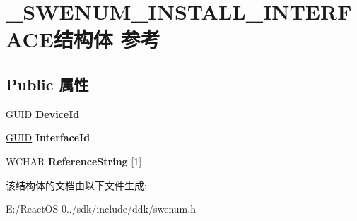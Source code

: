 \hypertarget{struct___s_w_e_n_u_m___i_n_s_t_a_l_l___i_n_t_e_r_f_a_c_e}{}\section{\+\_\+\+S\+W\+E\+N\+U\+M\+\_\+\+I\+N\+S\+T\+A\+L\+L\+\_\+\+I\+N\+T\+E\+R\+F\+A\+C\+E结构体 参考}
\label{struct___s_w_e_n_u_m___i_n_s_t_a_l_l___i_n_t_e_r_f_a_c_e}
\subsection*{Public 属性}
\begin{DoxyCompactItemize}
\item 
\mbox{\label{struct___s_w_e_n_u_m___i_n_s_t_a_l_l___i_n_t_e_r_f_a_c_e_af4cd6357b46129f77a8c8bd18ed1926d}} 
\hyperlink{interface_g_u_i_d}{G\+U\+ID} {\bfseries Device\+Id}
\item 
\mbox{\label{struct___s_w_e_n_u_m___i_n_s_t_a_l_l___i_n_t_e_r_f_a_c_e_a49b3e677d7ae37f2fea2adf490330a36}} 
\hyperlink{interface_g_u_i_d}{G\+U\+ID} {\bfseries Interface\+Id}
\item 
\mbox{\label{struct___s_w_e_n_u_m___i_n_s_t_a_l_l___i_n_t_e_r_f_a_c_e_a6c3ac2b1a3c8613dfb21425ed45faba4}} 
W\+C\+H\+AR {\bfseries Reference\+String} \mbox{[}1\mbox{]}
\end{DoxyCompactItemize}


该结构体的文档由以下文件生成\+:\begin{DoxyCompactItemize}
\item 
E\+:/\+React\+O\+S-\/0../sdk/include/ddk/swenum.\+h\end{DoxyCompactItemize}
